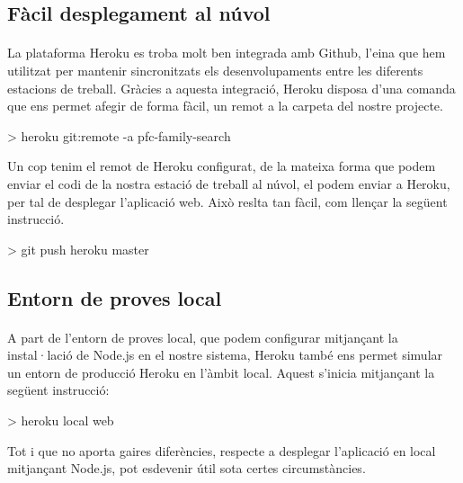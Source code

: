     \subsection{Fàcil desplegament al núvol}

    \paragraph{}
    La plataforma Heroku es troba molt ben integrada amb Github, l'eina que hem utilitzat per mantenir sincronitzats els desenvolupaments entre les diferents estacions de treball. Gràcies a aquesta integració, Heroku disposa d'una comanda que ens permet afegir de forma fàcil, un remot a la carpeta del nostre projecte.

    \begin{displayquote}
        > heroku git:remote -a pfc-family-search
    \end{displayquote}

    Un cop tenim el remot de Heroku configurat, de la mateixa forma que podem enviar el codi de la nostra estació de treball al núvol, el podem enviar a Heroku, per tal de desplegar l'aplicació web. Això reslta tan fàcil, com llençar la següent instrucció.

    \begin{displayquote}
        > git push heroku master
    \end{displayquote}


    \subsection{Entorn de proves local}

    \paragraph{}
    A part de l'entorn de proves local, que podem configurar mitjançant la instal·lació de Node.js en el nostre sistema, Heroku també ens permet simular un entorn de producció Heroku en l'àmbit local. Aquest s'inicia mitjançant la següent instrucció:

    \begin{displayquote}
        > heroku local web
    \end{displayquote}

    Tot i que no aporta gaires diferències, respecte a desplegar l'aplicació en local mitjançant Node.js, pot esdevenir útil sota certes circumstàncies.


